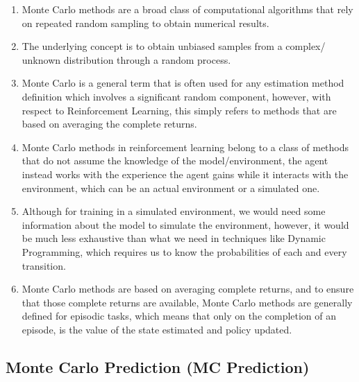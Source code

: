 \begin{enumerate}
    \item Monte Carlo methods are a broad class of computational algorithms that rely on repeated random sampling to obtain numerical results.

    \item The underlying concept is to obtain unbiased samples from a complex/ unknown distribution through a random process.

    \item Monte Carlo is a general term that is often used for any estimation method definition which involves a significant random component, however, with respect to Reinforcement Learning, this simply refers to methods that are based on averaging the complete returns. \cite{medium/nerd-for-tech/monte-carlo-methods-for-reinforcement-learning-d30d874dd817}

    \item Monte Carlo methods in reinforcement learning belong to a class of methods that do not assume the knowledge of the model/environment, the agent instead works with the experience the agent gains while it interacts with the environment, which can be an actual environment or a simulated one. \cite{medium/nerd-for-tech/monte-carlo-methods-for-reinforcement-learning-d30d874dd817}
    
    \item Although for training in a simulated environment, we would need some information about the model to simulate the environment, however, it would be much less exhaustive than what we need in techniques like Dynamic Programming, which requires us to know the probabilities of each and every transition. \cite{medium/nerd-for-tech/monte-carlo-methods-for-reinforcement-learning-d30d874dd817}

    \item Monte Carlo methods are based on averaging complete returns, and to ensure that those complete returns are available, Monte Carlo methods are generally defined for episodic tasks, which means that only on the completion of an episode, is the value of the state estimated and policy updated. \cite{medium/nerd-for-tech/monte-carlo-methods-for-reinforcement-learning-d30d874dd817}

\end{enumerate}

\subsection{Monte Carlo Prediction (MC Prediction) \cite{medium/nerd-for-tech/monte-carlo-methods-for-reinforcement-learning-d30d874dd817}} \label{Monte Carlo Prediction}

